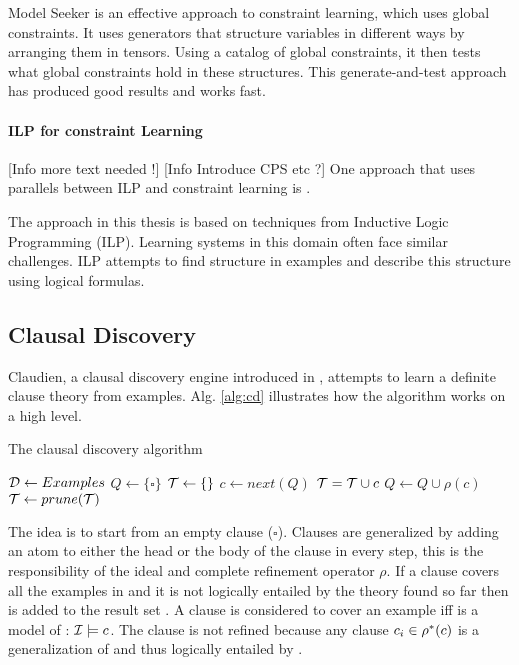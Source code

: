 Model Seeker \cite{Beldiceanu:ModelSeeker} is an effective approach to constraint learning, which uses global constraints.
It uses generators that structure variables in different ways by arranging them in tensors.
Using a catalog of global constraints, it then tests what global constraints hold in these structures.
This generate-and-test approach has produced good results and works fast.

\paragraph{ILP for constraint Learning}
[Info more text needed !] [Info Introduce CPS etc ?]
One approach that uses parallels between ILP and constraint learning is \cite{Lallouet:LearningCP}.

The approach in this thesis is based on techniques from Inductive Logic Programming (ILP).
Learning systems in this domain often face similar challenges.
ILP attempts to find structure in examples and describe this structure using logical formulas.

\subsection{Clausal Discovery}
Claudien, a clausal discovery engine introduced in \cite{DeRaedt:ClausalDiscovery}, attempts to learn a definite clause theory from examples.
Alg. \ref{alg:cd} illustrates how the algorithm works on a high level. 

\begin{algorithm}
	\caption{The clausal discovery algorithm}
	\label{alg:cd}

	\begin{algorithmic}
	\State $\mathcal{D} \gets Examples$
	\State $Q \gets \{\square\}$
	\State $\mathcal{T} \gets \{\}$
		\State $c \gets next(Q)$
				\State $\mathcal{T} = \mathcal{T} \cup c$
			\EndIf
		\Else
			\State $Q \gets Q \cup \rho(c)$
		\EndIf
	\EndWhile
	\State $\mathcal{T} \gets prune(\mathcal{T})$
	\State \Return {}
	\end{algorithmic}
\end{algorithm}

The idea is to start from an empty clause ($\square$).
Clauses are generalized by adding an atom to either the head or the body of the clause in every step, this is the responsibility of the ideal and complete refinement operator $\rho$.
If a clause  covers all the examples in  and it is not logically entailed by the theory found so far then  is added to the result set .
A clause  is considered to cover an example  iff  is a model of : $\mathcal{I} \models c$.
The clause  is not refined because any clause $c_i \in \rho^*(c)$ is a generalization of  and thus logically entailed by .

